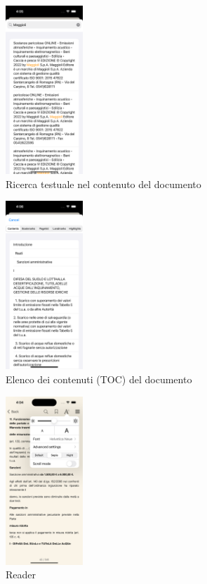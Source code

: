\begin{multicols}{3}
    \begin{figure}[H]
        \centering
        \includegraphics[width=0.26\textwidth]{img/ricerca_testo_ios.png}
        \caption{Ricerca testuale nel contenuto del documento}
        \label{ricerca_testo-ios}
    \end{figure}

    \begin{figure}[H]
        \centering
        \includegraphics[width=0.26\textwidth]{img/toc_ios.png}
        \caption{Elenco dei contenuti (TOC) del documento}
        \label{toc-ios}
    \end{figure}

    \begin{figure}[H]
        \centering
        \includegraphics[width=0.26\textwidth]{img/reader_settings_ios.png}
        \caption{Reader}
        \label{readersettings-ios}
    \end{figure}
    

\end{multicols}
